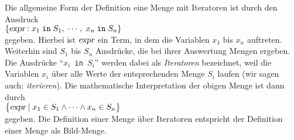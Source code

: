Die allgemeine Form der Definition eine Menge mit Iteratoren ist durch den Ausdruck
\\[0.2cm]
\hspace*{1.3cm} 
$\{ \textsl{expr} : x_1 \;\mathtt{in}\; S_1,\; \cdots,\; x_n \;\mathtt{in}\; S_n \}$ 
\\[0.2cm]
gegeben.
Hierbei ist $\textsl{expr}$ ein Term, in dem die Variablen $x_1$ bis $x_n$
auftreten.  Weiterhin sind
$S_1$ bis $S_n$ Ausdr\"{u}cke, die bei ihrer Auswertung Mengen ergeben.  Die
Ausdr\"{u}cke ``\texttt{$x_i$ in $S_i$}'' werden dabei als \emph{Iteratoren} bezeichnet,
weil die Variablen $x_i$ \"{u}ber alle Werte der entsprechenden Menge $S_i$ laufen
(wir  sagen auch: \emph{iterieren}).
Die mathematische Interpretation der obigen Menge ist dann durch \\[0.2cm]
\hspace*{1.3cm} 
$\bigl\{ \textsl{expr} \mid x_1 \in S_1 \wedge \cdots \wedge x_n \in S_n \bigr\}$ 
\\[0.2cm]
gegeben.  Die Definition einer Menge \"{u}ber Iteratoren entspricht  der
Definition einer Menge als Bild-Menge.

